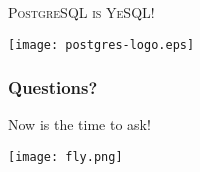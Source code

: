 \documentclass{beamer}
\begin{document}
\begin{frame}
  \begin{center}
    \textsc{\Huge PostgreSQL is YeSQL!}
    \vfill

    \texttt{[image: postgres-logo.eps]}
  \end{center}
\end{frame}

\begin{frame}
  \frametitle{Questions?}

  \begin{center}
    Now is the time to ask!
    \vfill

    \texttt{[image: fly.png]}
  \end{center}
\end{frame}
\end{document}
